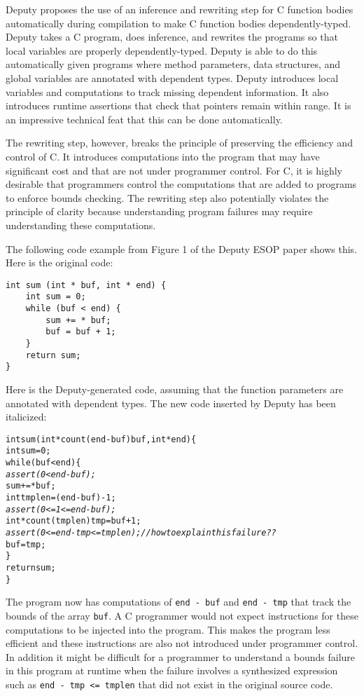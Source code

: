 Deputy proposes the use of an inference and rewriting step for C
function bodies automatically during compilation to make C function
bodies dependently-typed. Deputy takes a C program, does inference, and
rewrites the programs so that local variables are properly
dependently-typed. Deputy is able to do this automatically given
programs where method parameters, data structures, and global variables
are annotated with dependent types. Deputy introduces local variables
and computations to track missing dependent information. It also
introduces runtime assertions that check that pointers remain within
range. It is an impressive technical feat that this can be done
automatically.

The rewriting step, however, breaks the principle of preserving the
efficiency and control of C. It introduces computations into the program
that may have significant cost and that are not under programmer
control. For C, it is highly desirable that programmers control the
computations that are added to programs to enforce bounds checking. The
rewriting step also potentially violates the principle of clarity
because understanding program failures may require understanding these
computations.

The following code example from Figure 1 of the Deputy ESOP paper shows
this. Here is the original code:
\begin{verbatim}
int sum (int * buf, int * end) {
    int sum = 0;
    while (buf < end) {
        sum += * buf;
        buf = buf + 1;
    }
    return sum;
}
\end{verbatim}

Here is the Deputy-generated code, assuming that the function parameters
are annotated with dependent types. The new code inserted by Deputy has
been italicized:

\begin{alltt}
int sum (int * count(end - buf) buf, int * end) \{
    int sum = 0;
    while (buf < end) \{
        \textit{assert(0 < end - buf);}
        sum += * buf;
        int tmplen = (end - buf) - 1;
        \textit{assert(0 <= 1 <= end - buf);}
        int * count(tmplen) tmp = buf + 1;
        \textit{assert(0 <= end - tmp <= tmplen);  // how to explain this failure??}
        buf = tmp;
    \}
    return sum;
\}
\end{alltt}

The program now has computations of \texttt{end - buf} and \texttt{end
- tmp} that track the bounds of the array \texttt{buf}. A C programmer
would not expect instructions for these computations to be injected into
the program. This makes the program less efficient and these
instructions are also not introduced under programmer control. In
addition it might be difficult for a programmer to understand a bounds
failure in this program at runtime when the failure involves a
synthesized expression such as \verb|end - tmp <= tmplen| that did not
exist in the original source code.

